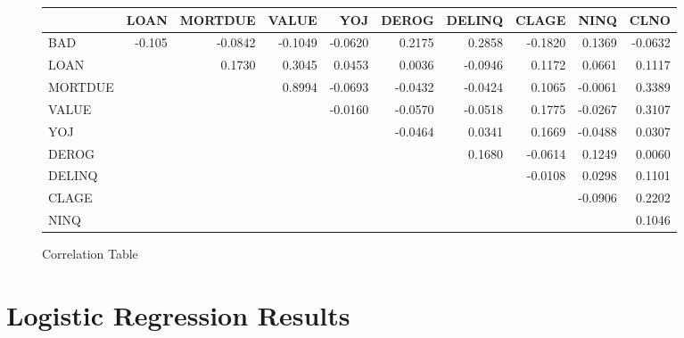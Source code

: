 \begin{appendices}
\begin{landscape}
\begin{figure}[ht]
	\centering
	\renewcommand{\arraystretch}{2}
	\begin{tabular}{lrrrrrrrrr}
		\toprule
		{} &   LOAN &  MORTDUE &   VALUE &     YOJ &   DEROG &  DELINQ &   CLAGE &    NINQ &    CLNO \\
		\midrule
		BAD       & -0.105 &  -0.0842 & -0.1049 & -0.0620 &  0.2175 &  0.2858 & -0.1820 &  0.1369 & -0.0632 \\
		LOAN       &     &   0.1730 &  0.3045 &  0.0453 &  0.0036 & -0.0946 &  0.1172 &  0.0661 &  0.1117 \\
		MORTDUE   &     &       &  0.8994 & -0.0693 & -0.0432 & -0.0424 &  0.1065 & -0.0061 &  0.3389 \\
		VALUE      &     &       &      & -0.0160 & -0.0570 & -0.0518 &  0.1775 & -0.0267 &  0.3107 \\
		YOJ        &     &       &      &      & -0.0464 &  0.0341 &  0.1669 & -0.0488 &  0.0307 \\
		DEROG      &     &       &      &      &      &  0.1680 & -0.0614 &  0.1249 &  0.0060 \\
		DELINQ     &     &       &      &      &      &      & -0.0108 &  0.0298 &  0.1101 \\
		CLAGE      &     &       &      &      &      &      &      & -0.0906 &  0.2202 \\
		NINQ       &     &       &      &      &      &      &      &      &  0.1046 \\
		\bottomrule
	\end{tabular}
	\caption{Correlation Table \label{CORR_TBL}}
\end{figure}
\end{landscape}

\chapter{Logistic Regression Results}


\end{appendices}
